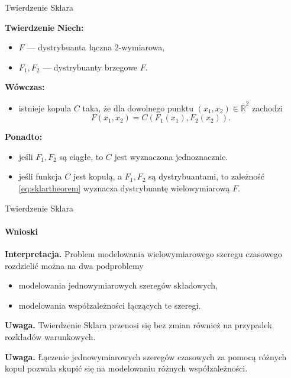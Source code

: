 \documentclass[a4paper, 11pt]{beamer}
\begin{document}
	\begin{frame}{Twierdzenie Sklara}

		\begin{block}{\textbf{Twierdzenie}}
			\textbf{Niech:}
			\begin{itemize}
				\item $F$ --- dystrybuanta łączna 2-wymiarowa,
				\item $F_{1}, F_{2}$ --- dystrybuanty brzegowe $F.$
			\end{itemize}
			\textbf{Wówczas:}
			\begin{itemize}
				\item istnieje kopula $C$ taka, że dla dowolnego punktu
					$\left(x_{1}, x_{2}\right) \in \overline{\mathbb{R}}^{2}$
					zachodzi
					\begin{equation}\label{eq:sklartheorem}
						F\left(x_{1}, x_{2}\right) = C\left(F_1\left(x_1\right), F_2\left(x_2\right)\right).
					\end{equation}
			\end{itemize}
			\textbf{Ponadto:}
			\begin{itemize}
				\item jeśli $F_{1}, F_{2}$ są ciągłe, to $C$ jest wyznaczona jednoznacznie.
				\item jeśli funkcja $C$ jest kopulą, a  $F_{1}, F_{2}$ są dystrybuantami, to zależność
					\eqref{eq:sklartheorem} wyznacza dystrybuantę wielowymiarową $F.$
			\end{itemize}
		\end{block}
		
	\end{frame}
	
	\begin{frame}{Twierdzenie Sklara}
		\framesubtitle{Wnioski}
		
		\begin{alert}{\textbf{Interpretacja.}}
			Problem modelowania wielowymiarowego szeregu czasowego
			rozdzielić można na dwa podproblemy
			\begin{itemize}
				\item modelowania jednowymiarowych szeregów składowych,
				\item modelowania współzależności łączących te szeregi.
			\end{itemize}
		\end{alert}
		
		\begin{alert}{\textbf{Uwaga.}}
			Twierdzenie Sklara przenosi się bez zmian również na
			przypadek rozkładów warunkowych.
		\end{alert}
		
		\begin{alert}{\textbf{Uwaga.}}
			Łączenie jednowymiarowych szeregów czasowych za pomocą różnych
			kopul pozwala skupić się na modelowaniu różnych współzależności.
		\end{alert}
	\end{frame}
	
\end{document}
